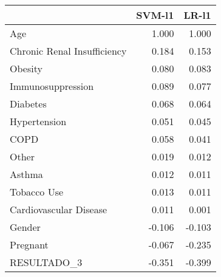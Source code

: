 \begin{tabular}{lrr}
\toprule
{} &  SVM-l1 &  LR-l1 \\
\midrule
Age                         &   1.000 &  1.000 \\
Chronic Renal Insufficiency &   0.184 &  0.153 \\
Obesity                     &   0.080 &  0.083 \\
Immunosuppression           &   0.089 &  0.077 \\
Diabetes                    &   0.068 &  0.064 \\
Hypertension                &   0.051 &  0.045 \\
COPD                        &   0.058 &  0.041 \\
Other                       &   0.019 &  0.012 \\
Asthma                      &   0.012 &  0.011 \\
Tobacco Use                 &   0.013 &  0.011 \\
Cardiovascular Disease      &   0.011 &  0.001 \\
Gender                      &  -0.106 & -0.103 \\
Pregnant                    &  -0.067 & -0.235 \\
RESULTADO\_3                 &  -0.351 & -0.399 \\
\bottomrule
\end{tabular}
